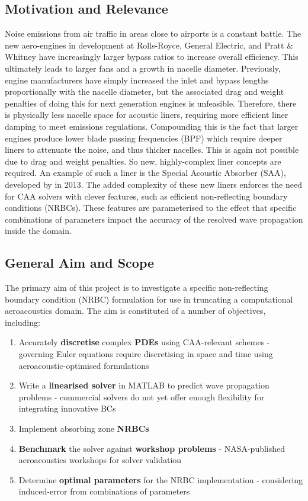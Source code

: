 
\subsection{Motivation and Relevance}

Noise emissions from air traffic in areas close to airports is a constant battle. The new aero-engines in development at Rolls-Royce, General Electric, and Pratt \& Whitney have increasingly larger bypass ratios to increase overall efficiency. This ultimately leads to larger fans and a growth in nacelle diameter. Previously, engine manufacturers have simply increased the inlet and bypass lengths proportionally with the nacelle diameter, but the associated drag and weight penalties of doing this for next generation engines is unfeasible. Therefore, there is physically less nacelle space for acoustic liners, requiring more efficient liner damping to meet emissions regulations. Compounding this is the fact that larger engines produce lower blade passing frequencies (BPF) which require deeper liners to attenuate the noise, and thus thicker nacelles. This is again not possible due to drag and weight penalties. So new, highly-complex liner concepts are required. An example of such a liner is the Special Acoustic Absorber (SAA), developed by \textcite{redmann2013aeroacousticliner} in 2013. The added complexity of these new liners enforces the need for CAA solvers with clever features, such as efficient non-reflecting boundary conditions (NRBCs). These features are parameterised to the effect that specific combinations of parameters impact the accuracy of the resolved wave propagation inside the domain. 



\subsection{General Aim and Scope}
The primary aim of this project is to investigate a specific non-reflecting boundary condition (NRBC) formulation for use in truncating a computational aeroacoustics domain. The aim is constituted of a number of objectives, including:

\begin{enumerate}
\itemsep0em
\item Accurately \textbf{discretise} complex \textbf{PDEs} using CAA-relevant schemes - governing Euler equations require discretising in space and time using aeroacoustic-optimised formulations
\item Write a \textbf{linearised solver} in MATLAB to predict wave propagation problems - commercial solvers do not yet offer enough flexibility for integrating innovative BCs
\item Implement absorbing zone \textbf{NRBCs}
\item \textbf{Benchmark} the solver against \textbf{workshop problems} - NASA-published aeroacoustics workshops for solver validation
\item Determine \textbf{optimal parameters} for the NRBC implementation - considering induced-error from combinations of parameters
\end{enumerate}

